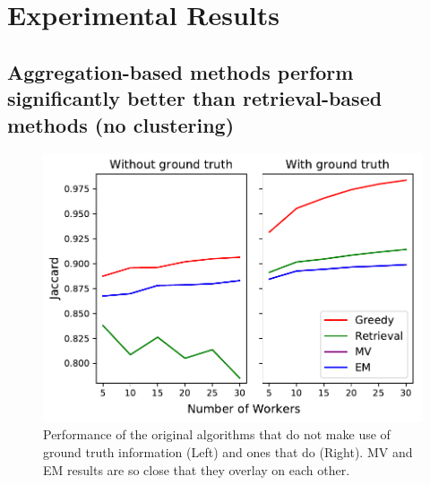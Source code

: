 \section{Experimental Results\label{sec:experiment}}
\subsection{Aggregation-based methods perform significantly better than retrieval-based methods (no clustering)}
\begin{figure}[h!]
   \centering
   \includegraphics[trim={0 1pt 4pt 0},clip,width=0.8\linewidth]{plots/Retrieval_vs_Aggregation.pdf}
   \caption{Performance of the original algorithms that do not make use of ground truth information (Left) and ones that do (Right). MV and EM results are so close that they overlay on each other.} %
   \label{retrieval_vs_aggregation}   
\end{figure} 
